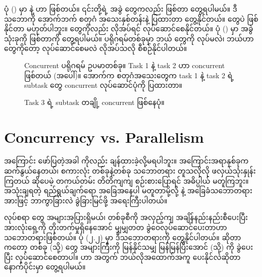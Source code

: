 ပုံ (\fRefNo{\ref{fig:concurrent1}}) မှာ  နဲ့  ဟာ  ဖြစ်တယ်။ ၎င်းတို့ရဲ့ အခွဲ  တွေကလည်း  ဖြစ်တာ တွေ့ရပါမယ်။ ဒီသဘောကို အောက်ဘက် စတုဂံ အသေးနှစ်တန်းနဲ့  ပြထားတာ တွေ့နိုင်တယ်။  တွေပဲ  ဖြစ်နိုင်တာ မဟုတ်ပါဘူး။  တွေကိုလည်း လိုအပ်ရင်  လုပ်ဆောင်စေနိုင်တယ်။ ပုံ (\fRefNo{\ref{fig:concurrent2}}) မှာ  အခွဲ  သုံးခုကို  ဖြစ်တာကို တွေ့ရပါမယ်။  ပရိုဂရမ်တစ်ခုမှာ ဘယ်  တွေကို  လုပ်မလဲ၊ ဘယ်ဟာတွေကိုတော့  လုပ်ဆောင်စေမလဲ လိုအပ်သလို စီစဉ်နိုင်ပါတယ်။ 
\begin{figure}[H]
    \caption{Concurrent ပရိုဂရမ် ဥပမာတစ်ခု။ Task 1 နဲ့ task 2 ဟာ concurrent ဖြစ်တယ် (အပေါ်)။ အောက်က စတုဂံအသေးတွေက task 1 နဲ့ task 2 ရဲ့ subtask တွေ concurrent လုပ်ဆောင်ပုံကို ပြထားတာ။}
    \label{fig:concurrent1}
\end{figure}

\begin{figure}[H]
    \caption{Task 3 ရဲ့ subtask တချို့ concurrent ဖြစ်နေပုံ။}
    \label{fig:concurrent2}
\end{figure}%
%

\clearpage
\section{Concurrency vs. Parallelism}
 အကြောင်း ဖော်ပြတဲ့အခါ  ကိုလည်း ချန်ထားခဲ့လို့မရပါဘူး။ အကြောင်းအ\allowbreak ရာနှစ်ခုက ဆက်နွယ်နေတယ်၊ စကားလုံး တစ်ခုနဲ့တစ်ခု သဘောတရား တူသလိုလို ဖလှယ်သုံးနှုန်းကြတယ် ဆိုပေမဲ့ တကယ်တမ်း တိတိကျကျ စဉ်းစားပြောရင် အဓိပ္ပါယ်  မတူကြဘူး။ အသုံးချရတဲ့ ရည်ရွယ်ချက်ရော အခြေအနေပါ မတူတာမို့လို့  နဲ့  အခြေခံသဘောတရားအားဖြင့် ဘာကွာခြားလဲ ခွဲခြားမြင်ဖို့ အရေးကြီးပါတယ်။  


လုပ်စရာ  တွေ အများအပြားရှိမယ်၊ တစ်ခုစီကို အလှည့်ကျ အချိန်နည်းနည်းစီပေးပြီး အားလုံးရှေ့ကို တိုးတက်မှုရှိနေအောင် မျှမျှတတ ခွဲဝေလုပ်ဆောင်ပေးတာဟာ  သဘောတရားဖြစ်တယ်။ ပုံ (၂.၂) မှာ ဒီသဘောတရားကို တွေ့နိုင်ပါတယ်။  ဆိုတာကတော့  တစ်ခု (သို့)  တွေ အများကြီးကို မြန်နိုင်သမျှ မြန်မြန်ပြီးအောင်  (သို့)  ကို ခွဲပေးပြီး လုပ်ဆောင်စေတာပါ။  ဟာ  အတွက် ဘယ်လိုအထောက်အကူ ပေးနိုင်လဲဆိုတာ နောက်ပိုင်းမှာ တွေ့ရပါမယ်။


